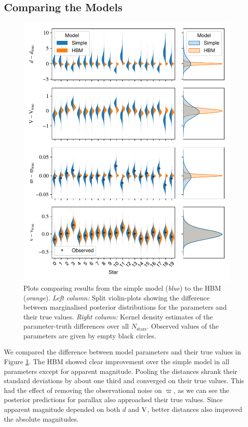 \subsection{Comparing the Models}\label{sec:hbm-comp}

\begin{figure}[p]
    \centering
    \includegraphics{figures/hbm-results.pdf}
    \caption[Plots comparing results from the simple model to the HBM]{Plots comparing results from the simple model (\emph{blue}) to the HBM (\emph{orange}). \emph{Left column:} Split violin-plots showing the difference between marginalised posterior distributions for the parameters and their true values. \emph{Right column:} Kernel density estimates of the parameter-truth differences over all \(N_\mathrm{stars}\). Observed values of the parameters are given by empty black circles.}
    \label{fig:hbm-results}
\end{figure}

We compared the difference between model parameters and their true values in Figure \ref{fig:hbm-results}. The HBM showed clear improvement over the simple model in all parameters except for apparent magnitude. Pooling the distances shrank their standard deviations by about one third and converged on their true values. This had the effect of removing the observational noise on \(\varpi\), as we can see the posterior predictions for parallax also approached their true values. Since apparent magnitude depended on both \(d\) and \(\mathrm{V}\), better distances also improved the absolute magnitudes.

